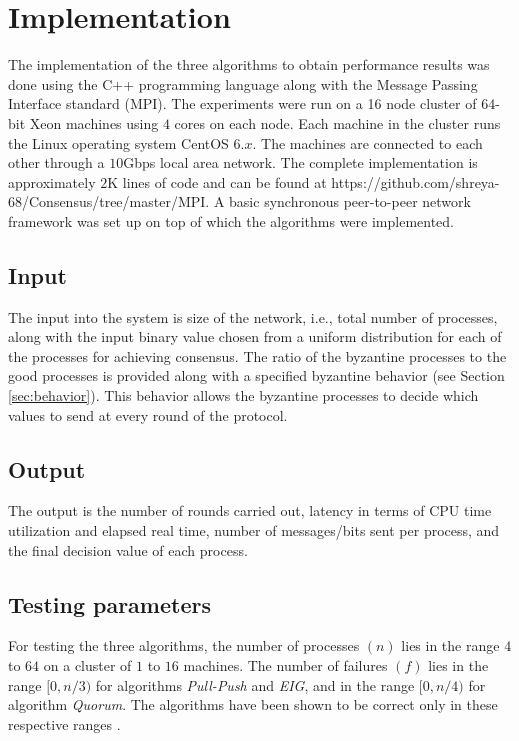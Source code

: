 ﻿\section{Implementation} \label{sec:eval} The implementation of the three
algorithms to obtain performance results was done using the C++ programming
language along with the Message Passing Interface standard (MPI).  The
experiments were run on a 16 node cluster of $64$-bit Xeon machines using $4$
cores on each node.  Each machine in the cluster runs the Linux operating
system CentOS $6.x$.  The machines are connected to each other through
a $10$Gbps local area network. The complete implementation is approximately
$2$K lines of code and can be found at
https://github.com/shreya-68/Consensus/tree/master/MPI. A basic synchronous
peer-to-peer network framework was set up on top of which the algorithms were
implemented.

\subsection{Input} The input into the system is size of the network, i.e.,
total number of processes, along with the input binary value chosen from a uniform distribution for each of the processes
for achieving consensus. The ratio of the byzantine processes to the good
processes is provided along with a specified byzantine behavior (see Section
\ref{sec:behavior}). This behavior allows the byzantine processes to decide
which values to send at every round of the protocol. 

\subsection{Output} The output is the number of rounds carried out, latency in
terms of CPU time utilization and elapsed real time, number of messages/bits
sent per process, and the final decision value of each process. 

\subsection{Testing parameters} For testing the three algorithms, the number of
processes $(n)$ lies in the range $4$ to $64$ on a cluster of $1$ to $16$
machines. The number of failures $(f)$ lies in the range $[0, n/3)$ for
    algorithms \textit{Pull-Push} and \textit{EIG}, and in the range $[0, n/4)$
        for algorithm \textit{Quorum}. The algorithms have been shown to be
        correct only in these respective ranges \cite{BGH13,KM13,BPV06}. 

